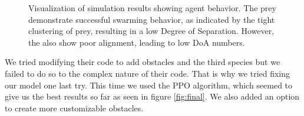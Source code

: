 \documentclass[9pt]{pnas-new}
\begin{document}
\begin{figure}[ht]
\begin{subfigure}{0.30\textwidth}
		\vspace{0.5em}
	\end{subfigure}
	\hfill
	\begin{subfigure}{0.30\textwidth}
		\centering
		\vspace{0.5em}
	\end{subfigure}
	
	\caption{Visualization of simulation results showing agent behavior. The prey demonstrate successful swarming behavior, as indicated by the tight clustering of prey, resulting in a low Degree of Separation. However, the also show poor alignment, leading to low DoA numbers.}
	\label{fig:article}
\end{figure}

We tried modifying their code to add obstacles and the third species but we failed to do so to the complex nature of their code. That is why we tried fixing our model one last try. This time we used the PPO algorithm, which seemed to give us the best results so far as seen in figure \ref{fig:final}. We also added an option to create more customizable obstacles. 
\end{document}
